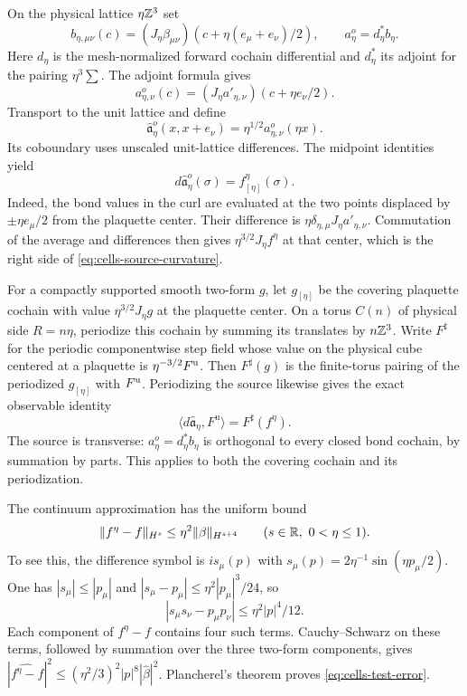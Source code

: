 On the physical lattice $\eta\mathbb Z^3$ set
\[
 b_{\eta,\mu\nu}(c)
       =(J_\eta\beta_{\mu\nu})
                       (c+\eta(e_\mu+e_\nu)/2),\qquad
 a_\eta^o=d_\eta^*b_\eta.
\]
Here $d_\eta$ is the mesh-normalized forward cochain differential
and $d_\eta^*$ its adjoint for the pairing $\eta^3\sum$.
The adjoint formula gives
\begin{equation}\label{eq:cells-midpoint-source}
 a_{\eta,\nu}^o(c)=(J_\eta a'_{\eta,\nu})(c+\eta e_\nu/2).
\end{equation}
Transport to the unit lattice and define
\[
 \hat{\mathfrak a}_\eta^o(x,x+e_\nu)
                    =\eta^{1/2}a_{\eta,\nu}^o(\eta x).
\]
Its coboundary uses unscaled unit-lattice differences. The
midpoint identities yield
\begin{equation}\label{eq:cells-source-curvature}
 d\hat{\mathfrak a}_\eta^o(\sigma)
                        =f^\eta_{[\eta]}(\sigma).
\end{equation}
Indeed, the bond values in the curl are evaluated at the two
points displaced by $\pm\eta e_\mu/2$ from the plaquette center.
Their difference is $\eta\delta_{\eta,\mu}J_\eta a'_{\eta,\nu}$.
Commutation of the average and differences then gives
$\eta^{3/2}J_\eta f^\eta$ at that center, which is the right
side of \eqref{eq:cells-source-curvature}.

For a compactly supported smooth two-form $g$, let $g_{[\eta]}$
be the covering plaquette cochain with value $\eta^{3/2}J_\eta g$
at the plaquette center. On a torus $C(n)$ of physical side
$R=n\eta$, periodize this cochain by summing its translates by
$n\mathbb Z^3$. Write $F^\sharp$ for the periodic componentwise step
field whose value on the physical cube centered at a plaquette
is $\eta^{-3/2}F^{\rm u}$. Then $F^\sharp(g)$ is the finite-torus
pairing of the periodized $g_{[\eta]}$ with $F^{\rm u}$.
Periodizing the source likewise gives the exact observable identity
\begin{equation}\label{eq:cells-observable}
 \langle d\hat{\mathfrak a}_\eta,F^{\mathrm u}\rangle
                            =F^\sharp(f^\eta).
\end{equation}
The source is transverse: $a_\eta^o=d_\eta^*b_\eta$ is
orthogonal to every closed bond cochain, by summation by
parts. This applies to both the covering cochain and its
periodization.

The continuum approximation has the uniform bound
\begin{equation}\label{eq:cells-test-error}
 \|f^\eta-f\|_{H^s}\le\eta^2\|\beta\|_{H^{s+4}}
                         \qquad(s\in\mathbb R,\ 0<\eta\le1).
\end{equation}
To see this, the difference symbol is
$is_\mu(p)$ with $s_\mu(p)=2\eta^{-1}\sin(\eta p_\mu/2)$.
One has $|s_\mu|\le|p_\mu|$ and
$|s_\mu-p_\mu|\le\eta^2|p_\mu|^3/24$, so
\[
 |s_\mu s_\nu-p_\mu p_\nu|
                               \le\eta^2|p|^4/12.
\]
Each component of $f^\eta-f$ contains four such terms.
Cauchy--Schwarz on these terms, followed by summation over
the three two-form components, gives
$|\widehat{f^\eta-f}|^2\le(\eta^2/3)^2|p|^8|\hat\beta|^2$.
Plancherel's theorem proves \eqref{eq:cells-test-error}.

